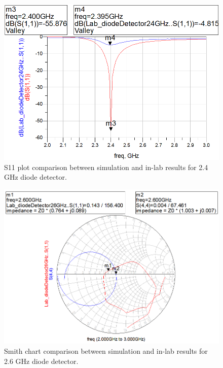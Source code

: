 \documentclass[conference]{IEEEtran}
\begin{document}
\begin{figure}[!htb]
\centering
\includegraphics[scale=0.4]{diode-pics/diodedetectorLab24S11.png}
\caption{S11 plot comparison between simulation and in-lab results for 2.4 GHz diode detector.}
\label{fig:resultS1124}
\end{figure}

\begin{figure}[!htb]
\centering
\includegraphics[scale=0.4]{diode-pics/diodedetectorLab26Smith.png}
\caption{Smith chart comparison between simulation and in-lab results for 2.6 GHz diode detector.}
\label{fig:resultSmith26}
\end{figure}
\end{document}
